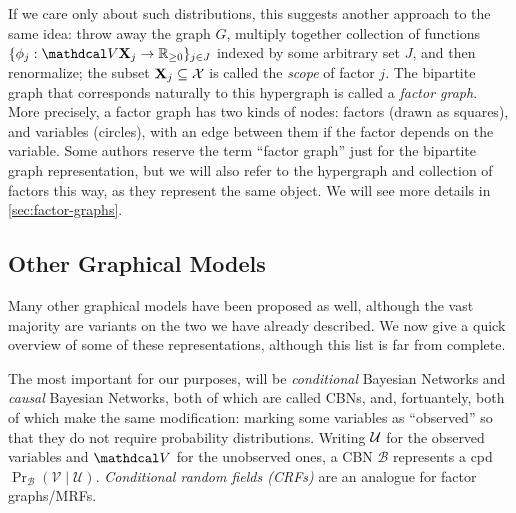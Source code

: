 If we care only about such distributions, this suggests another approach to the same idea: throw away the graph $G$, multiply together collection of functions $\{ \phi_{j} : \V \mat X_{j} \to \mathbb R_{\ge 0} \}_{j \in J}$ indexed by some arbitrary set $J$, and then renormalize;
    the subset $\mathbf X_j \subseteq \mathcal X$ is called the \emph{scope} of factor $j$. 
%
%
The bipartite graph that corresponds naturally to this hypergraph is called a \emph{factor graph}. 
More precisely, a factor graph has two kinds of nodes: factors (drawn as squares), and variables (circles), with an edge between them if the factor depends on the variable.
Some authors reserve the term ``factor graph'' just for the bipartite graph representation, but we will also refer to the hypergraph and collection of factors this way, as 
    they represent the same object. 
We will see more details in \cref{sec:factor-graphs}.


\subsection{Other Graphical Models}
    \label{sec:prelim-other-pgms}

Many other graphical models have been proposed as well, although
the vast majority are variants on the two we have already described. 
We now give a quick overview of some of these representations, although this list is far from complete. 
%

The most important for our purposes, will be \emph{conditional} Bayesian Networks and \emph{causal} Bayesian Networks, both of which are called CBNs, and, fortuantely, both of which make the same modification: marking some variables as ``observed'' so that they do not require probability distributions. 
Writing $\mathcal U$ for the observed variables and $\V$ for the unobserved ones, a CBN $\mathcal B$ represents a cpd $\Pr_{\mathcal B}(\mathcal V \mid \mathcal U)$. 
%
\emph{Conditional random fields (CRFs)} are an analogue for factor graphs/MRFs.


